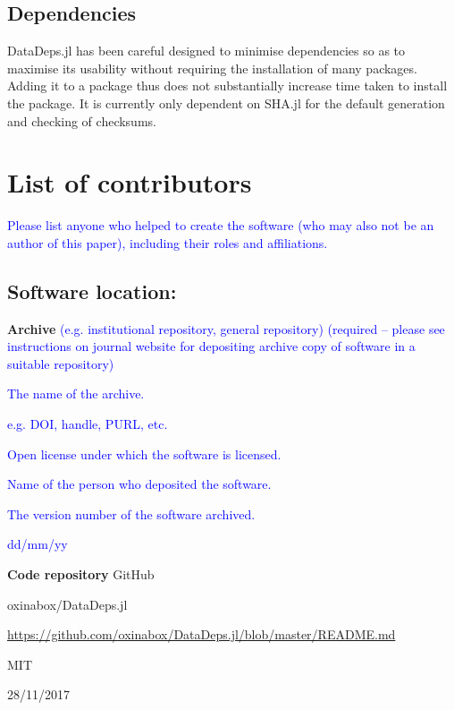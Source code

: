 \documentclass{jors}
\begin{document}
\subsection{Dependencies}
DataDeps.jl has been careful designed to minimise dependencies so as to maximise its usability without requiring the installation of many packages.
Adding it to a package thus does not substantially increase time taken to install the package.
It is currently only dependent on SHA.jl for the default generation and checking of checksums.

\section*{List of contributors}

\textcolor{blue}{Please list anyone who helped to create the software (who may also not be an author of this paper), including their roles and affiliations.}

\subsection{Software location:}

{\bf Archive} \textcolor{blue}{(e.g. institutional repository, general repository) (required – please see instructions on journal website for depositing archive copy of software in a suitable repository)} 

\begin{description}[noitemsep,topsep=0pt]
	\item[Name:] \textcolor{blue}{The name of the archive.}
	\item[Persistent identifier:] \textcolor{blue}{e.g. DOI, handle, PURL, etc.}
	\item[Licence:] \textcolor{blue}{Open license under which the software is licensed.}
	\item[Publisher:]  \textcolor{blue}{Name of the person who deposited the software.}
	\item[Version published:] \textcolor{blue}{The version number of the software archived.}
	\item[Date published:] \textcolor{blue}{dd/mm/yy}
\end{description}



{\bf Code repository} GitHub

\begin{description}[noitemsep,topsep=0pt]
	\item[Name:] oxinabox/DataDeps.jl
	\item[Persistent identifier:] \url{https://github.com/oxinabox/DataDeps.jl/blob/master/README.md}
	\item[Licence:] MIT
	\item[Date published:] 28/11/2017
\end{description}
\end{document}
